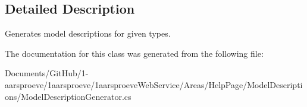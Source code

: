 \subsection{Detailed Description}
Generates model descriptions for given types. 



The documentation for this class was generated from the following file\+:\begin{DoxyCompactItemize}
\item 
Documents/\+Git\+Hub/1-\/aarsproeve/1aarsproeve/1aarsproeve\+Web\+Service/\+Areas/\+Help\+Page/\+Model\+Descriptions/Model\+Description\+Generator.\+cs\end{DoxyCompactItemize}
